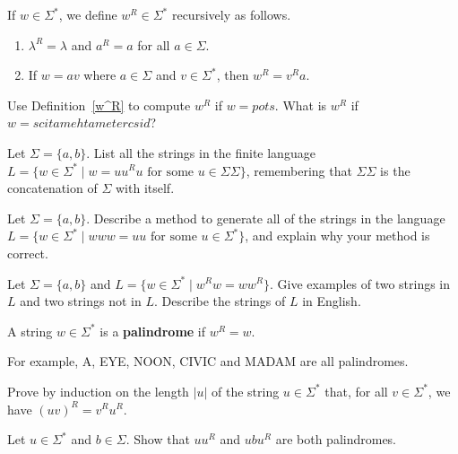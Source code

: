 \begin{dfn}\label{w^R}
If\/ $w\in \Sigma^*$, we define $w^R\in \Sigma^*$ recursively as follows.
\begin{enumerate}
\item $\lambda^R = \lambda$ and $a^R = a$ for all $a\in \Sigma$.
\item If\/ $w = av$ where $a\in \Sigma$ and $v\in \Sigma^*$, then $w^R = v^Ra$.
\end{enumerate}
\end{dfn}

\begin{prb}
Use Definition~\ref{w^R} to compute $w^R$ if\/ $w=pots$.  What is $w^R$ if\/ $w = scitamehtametercsid$?
\end{prb}

\begin{prb}
Let $\Sigma =\{a,b\}$.  List all the strings in the finite language $L = \{w \in \Sigma^* \mid w = uu^Ru \mbox{ for some } u\in \Sigma \Sigma\}$, remembering that $\Sigma \Sigma$ is the concatenation of $\Sigma$ with itself.
\end{prb}

\begin{prb}
Let $\Sigma =\{a,b\}$.  Describe a method to generate all of the strings in the language $L = \{w \in \Sigma^* \mid www = uu  \mbox{ for some } u \in \Sigma^*\}$, and explain why your method is correct.
\end{prb}

\begin{prb}
Let $\Sigma =\{a,b\}$ and $L = \{w \in \Sigma^* \mid w^Rw = ww^R\}$.  Give examples of two strings in $L$ and two strings not in $L$. Describe the strings of $L$ in English.
\end{prb}

\begin{dfn}
A string $w \in \Sigma^*$ is a \textbf{palindrome} if $w^R = w$.
\end{dfn}

\noindent For example, A, EYE, NOON, CIVIC and MADAM are all palindromes.

\begin{prb}
Prove by induction on the length $|u|$ of the string $u\in \Sigma^*$ that, for all $v\in \Sigma^*$, we have $(uv)^R = v^Ru^R$.
\end{prb}

\begin{prb}
Let $u\in \Sigma^*$ and $b \in \Sigma$.  Show that $uu^R$ and $ubu^R$ are both palindromes.
\end{prb}

